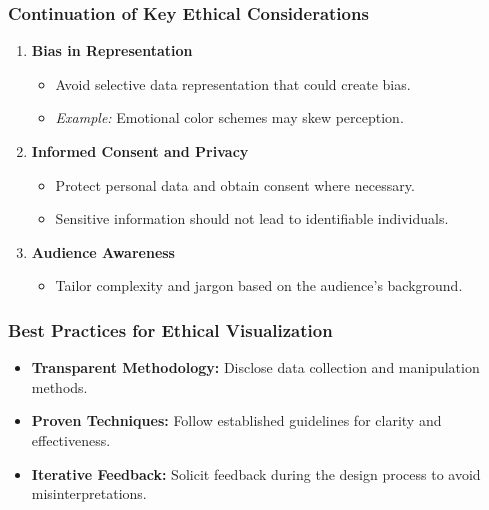 \documentclass[aspectratio=169]{beamer}
\begin{document}
\begin{frame}[fragile]
    \frametitle{Continuation of Key Ethical Considerations}
    \begin{enumerate}[resume]
        \item \textbf{Bias in Representation}
        \begin{itemize}
            \item Avoid selective data representation that could create bias.
            \item \textit{Example:} Emotional color schemes may skew perception.
        \end{itemize}
        
        \item \textbf{Informed Consent and Privacy}
        \begin{itemize}
            \item Protect personal data and obtain consent where necessary.
            \item Sensitive information should not lead to identifiable individuals.
        \end{itemize}
        
        \item \textbf{Audience Awareness}
        \begin{itemize}
            \item Tailor complexity and jargon based on the audience's background.
        \end{itemize}
    \end{enumerate}
\end{frame}

\begin{frame}[fragile]
    \frametitle{Best Practices for Ethical Visualization}
    \begin{itemize}
        \item \textbf{Transparent Methodology:} Disclose data collection and manipulation methods.
        \item \textbf{Proven Techniques:} Follow established guidelines for clarity and effectiveness.
        \item \textbf{Iterative Feedback:} Solicit feedback during the design process to avoid misinterpretations.
    \end{itemize}
\end{frame}
\end{document}
